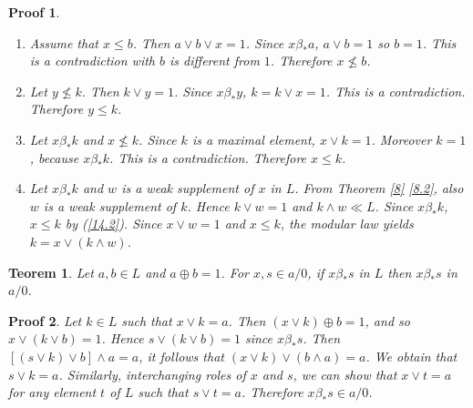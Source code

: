 \documentclass[a4paper,12pt]{article}
\numberwithin{equation}{section}
\theoremstyle{italik}
\newtheorem{teorem}{Teorem}[section]
\newtheorem*{ispat}{Proof}
\begin{document}
\begin{ispat}
    \begin{enumerate}
        \item
            Assume that $ x \leq b $. Then $ a \vee b \vee x = 1 $. Since $ x \beta_* a $, $ a \vee b = 1 $ so $ b = 1 $. 
            This is a contradiction with $ b $ is different from $ 1 $. 
            Therefore $ x \not\le b $.
        \item
            Let $ y \not\le k $. Then $ k \vee y = 1 $. Since $ x \beta_* y $, $ k = k \vee x = 1 $. This is a contradiction. 
            Therefore $ y \leq k $.
        \item
            Let $ x \beta_* k $ and $ x \not\le k $. Since $ k $ is a maximal element, $ x \vee k = 1 $. Moreover $ k = 1 $, 
            because $ x \beta_* k $. This is a contradiction. Therefore $ x \leq k $.
        \item
            Let $ x \beta_* k $ and $ w $ is a weak supplement of $ x $ in $ L $. From Theorem \ref{8} \ref{8.2}, 
            also $ w $ is a weak supplement of $ k $. Hence $ k \vee w = 1 $ and $ k \wedge w \ll L $. 
            Since $ x \beta_* k $, $ x \leq k $ by (\ref{14.2}). Since $ x \vee w = 1 $ 
            and $ x \leq k $, the modular law yields $ k = x \vee ( k \wedge w ) $.
    \end{enumerate}
\end{ispat}


\begin{teorem}\label{15}
    Let $ a, b \in L $ and $ a \oplus b = 1 $. For $ x,s \in a/0 $, if $ x \beta_* s $ in $ L $ then $ x \beta_* s $ in $ a/0 $.
\end{teorem}

\begin{ispat}
    Let $ k \in L $ such that $ x \vee k = a $. Then $ (x \vee k ) \oplus b = 1 $, and so $ x \vee ( k \vee b ) = 1 $. 
    Hence $ s \vee ( k \vee b ) = 1 $ since $ x \beta_* s $. Then $ \left[ (s \vee k ) \vee b \right] \wedge a = a $, 
    it follows that $ ( x \vee k ) \vee ( b \wedge a ) = a $. We obtain that $ s \vee k = a $. Similarly, interchanging 
    roles of $ x $ and $ s $, we can show that $ x \vee t = a $ for any element $ t $ of $ L $ such that $ s \vee t = a $. 
    Therefore $ x \beta_* s \in a/0 $.
\end{ispat}
\end{document}
